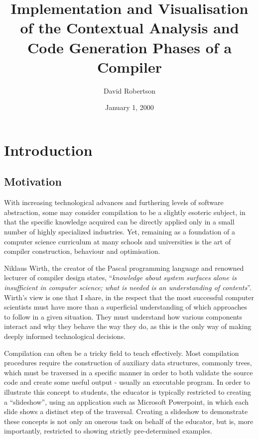 \documentclass{l4proj}
\begin{document}
\title{Implementation and Visualisation of the Contextual Analysis and Code Generation Phases of a Compiler}
\author{David Robertson}
\date{January 1, 2000}
\maketitle

\begin{abstract}

\end{abstract}

\educationalconsent
%
%
\tableofcontents

\chapter{Introduction}
\section{Motivation}
With increasing technological advances and furthering levels of software abstraction, some may consider compilation to be a slightly esoteric subject, in that the specific knowledge acquired can be directly applied only in a small number of highly specialized industries. Yet, remaining as a foundation of a computer science curriculum at many schools and universities is the art of compiler construction, behaviour and optimisation.

Niklaus Wirth, the creator of the Pascal programming language and renowned lecturer of compiler design states, ``\textit{knowledge about system surfaces alone is insufficient in computer science; what is needed is an understanding of contents}''. Wirth's view is one that I share, in the respect that the most successful computer scientists must have more than a superficial understanding of which approaches to follow in a given situation. They must understand how various components interact and why they behave the way they do, as this is the only way of making deeply informed technological decisions.

Compilation can often be a tricky field to teach effectively. Most compilation procedures require the construction of auxiliary data structures, commonly trees, which must be traversed in a specific manner in order to both validate the source code and create some useful output - usually an executable program. In order to illustrate this concept to students, the educator is typically restricted to creating a ``slideshow'', using an application such as Microsoft Powerpoint, in which each slide shows a distinct step of the traversal. Creating a slideshow to demonstrate these concepts is not only an onerous task on behalf of the educator, but is, more importantly, restricted to showing strictly pre-determined examples. 
\end{document}

